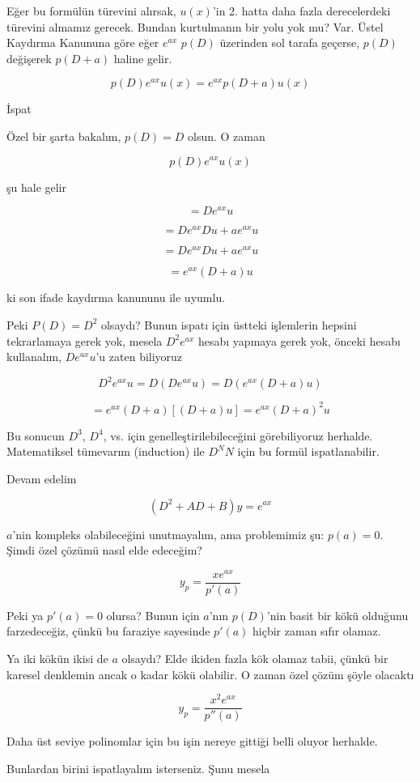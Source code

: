\documentclass[12pt,fleqn]{article}\usepackage{../../common}
\begin{document}
Eğer bu formülün türevini alırsak, $u(x)$'in 2. hatta daha fazla
derecelerdeki türevini almamız gerecek. Bundan kurtulmanın bir yolu yok mu?
Var. Üstel Kaydırma Kanununa göre eğer $e^{ax}$ $p(D)$ üzerinden sol tarafa
geçerse, $p(D)$ değişerek $p(D+a)$ haline gelir. 

$$ p(D)e^{ax}u(x) = e^{ax}p(D+a)u(x)$$

İspat

Özel bir şarta bakalım, $p(D) = D$ olsun. O zaman 

$$ p(D)e^{ax}u(x) $$

şu hale gelir

$$ = De^{ax}u$$

$$ = De^{ax}Du + ae^{ax}u $$

$$ = De^{ax}Du + ae^{ax}u $$

$$ = e^{ax}(D + a)u $$

ki son ifade kaydırma kanununu ile uyumlu. 

Peki $P(D) = D^2$ olsaydı? Bunun ispatı için üstteki işlemlerin hepsini
tekrarlamaya gerek yok, mesela $D^2e^{ax}$ hesabı yapmaya gerek yok,
önceki hesabı kullanalım, $De^{ax}u$'u zaten biliyoruz

$$  D^2e^{ax}u = D(De^{ax}u) = D(e^{ax}(D+a)u)  $$

$$ = e^{ax}(D+a)[(D+a)u] = e^{ax}(D+a)^2u $$

Bu sonucun $D^3$, $D^4$, vs. için genelleştirilebileceğini görebiliyoruz
herhalde. Matematiksel tümevarım (induction) ile $D^NN$ için bu formül
ispatlanabilir. 

Devam edelim

$$ (D^2+AD+B)y = e^{ax} $$

$a$'nin kompleks olabileceğini unutmayalım, ama problemimiz şu: $p(a) =
0$. Şimdi özel çözümü nasıl elde edeceğim? 

$$ y_p = \frac{x e^{ax}}{p'(a)} $$

Peki ya $p'(a) = 0$  olursa? Bunun için $a$'nın $p(D)$'nin basit bir kökü
olduğunu farzedeceğiz, çünkü bu faraziye sayesinde $p'(a)$ hiçbir zaman
sıfır olamaz. 

Ya iki kökün ikisi de $a$ olsaydı? Elde ikiden fazla kök olamaz tabii,
çünkü bir karesel denklemin ancak o kadar kökü olabilir. O zaman özel çözüm
şöyle olacaktı

$$ y_p = \frac{x^2e^{ax}}{p''(a)} $$

Daha üst seviye polinomlar için bu işin nereye gittiği belli oluyor
herhalde. 

Bunlardan birini ispatlayalım isterseniz. Şunu mesela
\end{document}
